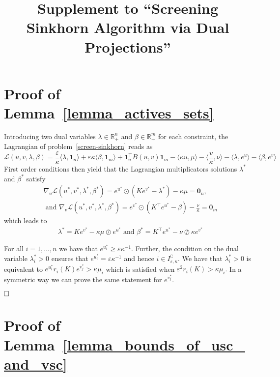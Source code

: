 \documentclass{article}
\title{Supplement to ``Screening Sinkhorn Algorithm via Dual Projections''}
\newcommand{\inr}[1]{\langle #1 \rangle}
\newcommand{\R}{{\mathbb{R}}}
\begin{document}
\maketitle

\section{Proof of Lemma~\ref{lemma_actives_sets}}

Introducing two dual variables $\lambda \in \R^n_{+}$ and $\beta \in \R^m_{+}$ for each constraint, the Lagrangian of problem~\eqref{screen-sinkhorn} reads as 
\begin{equation*}
  \mathscr{L}(u,v, \lambda, \beta) = \frac \varepsilon\kappa\inr{\lambda, \mathbf{1}_n} + \varepsilon\kappa\inr{\beta, \mathbf{1}_m} + \mathbf{1}_n^\top B(u,v) \mathbf{1}_m - \inr{\kappa u, \mu} - \inr{\frac v\kappa, \nu} -\inr{\lambda,e^{u}} - \inr{\beta,e^{v}}
\end{equation*}
First order conditions then yield that the Lagrangian multiplicators solutions $\lambda^{*}$ and $\beta^{*}$ satisfy 
\begin{align*}
  &\nabla_u\mathscr{L}(u^{*},v^{*}, \lambda^{*}, \beta^{*})=  e^{u^{*}} \odot(Ke^{v^{*}} - \lambda^{*}) - \kappa\mu = \mathbf 0_n,\\
  & \text{ and } \nabla_v\mathscr{L}(u^{*},v^{*}, \lambda^{*}, \beta^{*})=  e^{v^{*}} \odot(K^\top e^{u^{*}} - \beta) - \frac \nu\kappa = \mathbf 0_m
\end{align*}
which leads to 
\begin{align*}
  &\lambda^{*} = K e^{v^{*}} - \kappa\mu \oslash e^{u^{*}} \text{ and }
  \beta^{*} = K^\top e^{u^{*}} - \nu \oslash \kappa e^{v^{*}}
\end{align*}

For all $i=1, \ldots, n$ we have that $e^{u^{*}_i} \geq \varepsilon\kappa^{-1}$. Further, the condition on the dual variable $\lambda^{*}_i > 0$  ensures that $e^{u^{*}_i} = \varepsilon\kappa^{-1}$ and hence $i \in I^\complement_{\varepsilon,\kappa}$. We have that $\lambda^{*}_i > 0$ is equivalent to $e^{u^{*}_i}r_i(K) e^{v^{*}_j} >  \kappa{\mu_i}$ which  is satisfied when $\varepsilon^2r_i(K) >  \kappa{\mu_i}.$  
In a symmetric way we can prove the same statement for $e^{v^{*}_j}$.

$\hfill\square$


\section{Proof of Lemma~\ref{lemma_bounds_of_usc_and_vsc}}
\end{document}

